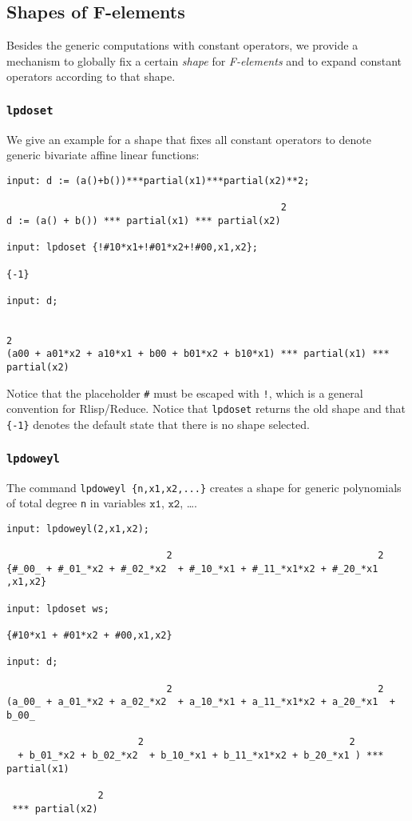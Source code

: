 \subsection{Shapes of F-elements}
Besides the generic computations with constant operators, we provide a
mechanism to globally fix a certain \emph{shape} for
\textit{F-elements} and to expand constant operators according to that
shape.
\subsubsection{\texttt{lpdoset}}
We give an example for a shape that fixes all constant operators to
denote generic bivariate affine linear functions:

\begin{footnotesize}
\begin{verbatim}
input: d := (a()+b())***partial(x1)***partial(x2)**2;

                                                2
d := (a() + b()) *** partial(x1) *** partial(x2)

input: lpdoset {!#10*x1+!#01*x2+!#00,x1,x2};

{-1}

input: d;

                                                                               2
(a00 + a01*x2 + a10*x1 + b00 + b01*x2 + b10*x1) *** partial(x1) *** partial(x2)
\end{verbatim}
\end{footnotesize}
Notice that the placeholder \texttt{\#} must be escaped with
\texttt{!}, which is a general convention for Rlisp/Reduce. Notice
that \texttt{lpdoset} returns the old shape and that \texttt{\{-1\}}
denotes the default state that there is no shape selected.

\subsubsection{\texttt{lpdoweyl}}
The command \texttt{lpdoweyl \{n,x1,x2,...\}} creates a shape for
generic polynomials of total degree \texttt{n} in variables
$\texttt{x1}$, $\texttt{x2}$, \dots.

\begin{footnotesize}
\begin{verbatim}
input: lpdoweyl(2,x1,x2);

                            2                                    2
{#_00_ + #_01_*x2 + #_02_*x2  + #_10_*x1 + #_11_*x1*x2 + #_20_*x1 ,x1,x2}

input: lpdoset ws;

{#10*x1 + #01*x2 + #00,x1,x2}

input: d;

                            2                                    2
(a_00_ + a_01_*x2 + a_02_*x2  + a_10_*x1 + a_11_*x1*x2 + a_20_*x1  + b_00_

                       2                                    2
  + b_01_*x2 + b_02_*x2  + b_10_*x1 + b_11_*x1*x2 + b_20_*x1 ) *** partial(x1)

                2
 *** partial(x2)
\end{verbatim}
\end{footnotesize}

